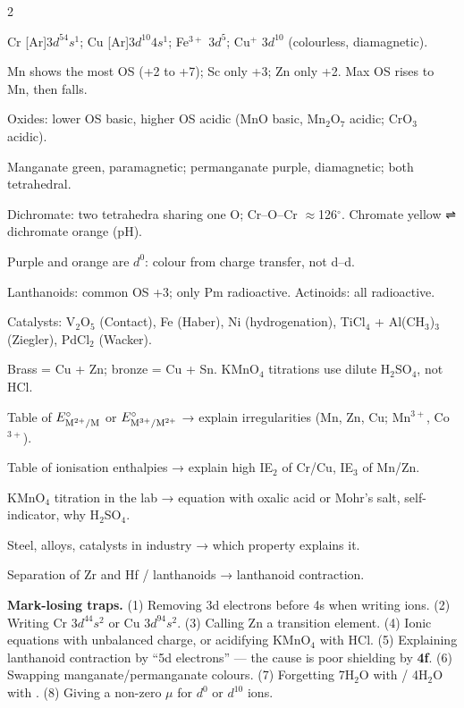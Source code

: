 \documentclass[10pt,a4paper]{extarticle}
\begin{document}
\begin{multicols}{2}
\begin{fl}
\item Cr [Ar]$3d^54s^1$; Cu [Ar]$3d^{10}4s^1$; Fe$^{3+}$ $3d^5$; Cu$^+$ $3d^{10}$ (colourless, diamagnetic).
\item Mn shows the most OS (+2 to +7); Sc only +3; Zn only +2. Max OS rises to Mn, then falls.
\item Oxides: lower OS basic, higher OS acidic (MnO basic, Mn$_2$O$_7$ acidic; CrO$_3$ acidic).
\item Manganate  green, paramagnetic; permanganate  purple, diamagnetic; both tetrahedral.
\item Dichromate: two tetrahedra sharing one O; Cr--O--Cr $\approx$126$^\circ$. Chromate yellow ⇌ dichromate orange (pH).
\item Purple  and orange  are $d^0$: colour from charge transfer, not d--d.
\item Lanthanoids: common OS +3; only Pm radioactive. Actinoids: all radioactive.
\item Catalysts: V$_2$O$_5$ (Contact), Fe (Haber), Ni (hydrogenation), TiCl$_4$ + Al(CH$_3$)$_3$ (Ziegler), PdCl$_2$ (Wacker).
\item Brass = Cu + Zn; bronze = Cu + Sn. KMnO$_4$ titrations use dilute H$_2$SO$_4$, not HCl.
\end{fl}

\begin{fl}
\item Table of $E^\circ_{\ce{M^2+/M}}$ or $E^\circ_{\ce{M^3+/M^2+}}$ → explain irregularities (Mn, Zn, Cu; Mn$^{3+}$, Co$^{3+}$).
\item Table of ionisation enthalpies → explain high IE$_2$ of Cr/Cu, IE$_3$ of Mn/Zn.
\item KMnO$_4$ titration in the lab → equation with oxalic acid or Mohr's salt, self-indicator, why H$_2$SO$_4$.
\item Steel, alloys, catalysts in industry → which property explains it.
\item Separation of Zr and Hf / lanthanoids → lanthanoid contraction.
\end{fl}

\begin{tip}\Tip \textbf{Mark-losing traps.} (1) Removing 3d electrons before 4s when writing ions. (2) Writing Cr $3d^44s^2$ or Cu $3d^94s^2$. (3) Calling Zn a transition element. (4) Ionic equations with unbalanced charge, or acidifying KMnO$_4$ with HCl. (5) Explaining lanthanoid contraction by ``5d electrons'' — the cause is poor shielding by \textbf{4f}. (6) Swapping manganate/permanganate colours. (7) Forgetting 7H$_2$O with  / 4H$_2$O with . (8) Giving a non-zero $\mu$ for $d^0$ or $d^{10}$ ions.\end{tip}
\end{multicols}
\begin{tcolorbox}[enhanced,colback=white,colframe=uc,boxrule=0.6pt,arc=2pt,title={\sffamily\bfseries\footnotesize My notes — Ch 4 d- and f-Block},colbacktitle=uc,coltitle=white,height fill,before skip=4pt]
\end{tcolorbox}
\end{document}
